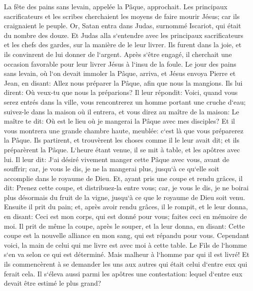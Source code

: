 \verse La fête des pains sans levain, appelée la Pâque, approchait. 
\verse Les principaux sacrificateurs et les scribes cherchaient les moyens de faire mourir Jésus; car ils craignaient le peuple. 
\verse Or, Satan entra dans Judas, surnommé Iscariot, qui était du nombre des douze. 
\verse Et Judas alla s`entendre avec les principaux sacrificateurs et les chefs des gardes, sur la manière de le leur livrer. 
\verse Ils furent dans la joie, et ils convinrent de lui donner de l`argent. 
\verse Après s`être engagé, il cherchait une occasion favorable pour leur livrer Jésus à l`insu de la foule. 
\verse Le jour des pains sans levain, où l`on devait immoler la Pâque, arriva, 
\verse et Jésus envoya Pierre et Jean, en disant: Allez nous préparer la Pâque, afin que nous la mangions. 
\verse Ils lui dirent: Où veux-tu que nous la préparions? 
\verse Il leur répondit: Voici, quand vous serez entrés dans la ville, vous rencontrerez un homme portant une cruche d`eau; suivez-le dans la maison où il entrera, 
\verse et vous direz au maître de la maison: Le maître te dit: Où est le lieu où je mangerai la Pâque avec mes disciples? 
\verse Et il vous montrera une grande chambre haute, meublée: c`est là que vous préparerez la Pâque. 
\verse Ils partirent, et trouvèrent les choses comme il le leur avait dit; et ils préparèrent la Pâque. 
\verse L`heure étant venue, il se mit à table, et les apôtres avec lui. 
\verse Il leur dit: J`ai désiré vivement manger cette Pâque avec vous, avant de souffrir; 
\verse car, je vous le dis, je ne la mangerai plus, jusqu`à ce qu`elle soit accomplie dans le royaume de Dieu. 
\verse Et, ayant pris une coupe et rendu grâces, il dit: Prenez cette coupe, et distribuez-la entre vous; 
\verse car, je vous le dis, je ne boirai plus désormais du fruit de la vigne, jusqu`à ce que le royaume de Dieu soit venu. 
\verse Ensuite il prit du pain; et, après avoir rendu grâces, il le rompit, et le leur donna, en disant: Ceci est mon corps, qui est donné pour vous; faites ceci en mémoire de moi. 
\verse Il prit de même la coupe, après le souper, et la leur donna, en disant: Cette coupe est la nouvelle alliance en mon sang, qui est répandu pour vous. 
\verse Cependant voici, la main de celui qui me livre est avec moi à cette table. 
\verse Le Fils de l`homme s`en va selon ce qui est déterminé. Mais malheur à l`homme par qui il est livré! 
\verse Et ils commencèrent à se demander les uns aux autres qui était celui d`entre eux qui ferait cela. 
\verse Il s`éleva aussi parmi les apôtres une contestation: lequel d`entre eux devait être estimé le plus grand? 
